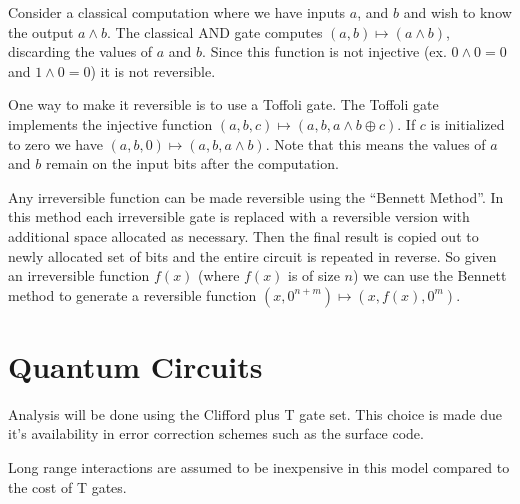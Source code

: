 Consider a classical computation where we have inputs $a$, and $b$ and wish to
know the output $a\land b$.  The classical AND gate computes $(a,b)\mapsto
(a\land b)$, discarding the values of $a$ and $b$.  Since this function is not
injective (ex. $0\land 0 = 0$ and $1 \land 0 = 0$) it is not reversible.

One way to make it reversible is to use a Toffoli gate. The Toffoli gate
implements the injective function $(a,b,c) \mapsto (a,b,a\land b \oplus c)$. If
$c$ is initialized to zero we have $(a,b,0) \mapsto (a,b,a\land b)$. Note that
this means the values of $a$ and $b$ remain on the input bits after the
computation.

Any irreversible function can be made reversible using the ``Bennett
Method''\cite{Bennett:73}. In this method each irreversible gate is replaced
with a reversible version with additional space allocated as necessary. Then the
final result is copied out to newly allocated set of bits and the entire circuit
is repeated in reverse. So given an irreversible function $f(x)$ (where $f(x)$
is of size $n$) we can use the Bennett method to generate a reversible function
$(x,0^{n+m}) \mapsto (x,f(x),0^m)$.


\section{Quantum Circuits}

Analysis will be done using the Clifford plus T gate set.
This choice is made due it's availability in error correction schemes such as
the surface code\cites{}.

Long range interactions are assumed to be inexpensive in this model compared to
the cost of T gates.

